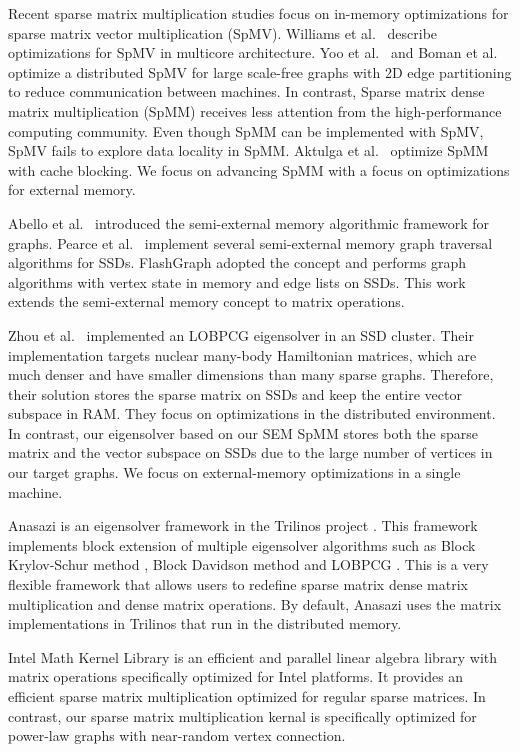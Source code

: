 Recent sparse matrix multiplication studies focus on in-memory optimizations
for sparse matrix vector multiplication (SpMV). Williams et al.~\cite{Williams07}
describe optimizations for SpMV in multicore architecture. Yoo et al.~\cite{Yoo11}
and Boman et al.~\cite{Boman2013} optimize a distributed SpMV for large
scale-free graphs with 2D edge partitioning to reduce communication between
machines. In contrast, Sparse matrix dense matrix multiplication (SpMM) receives
less attention from the high-performance computing community. Even though
SpMM can be implemented with SpMV, SpMV fails to explore data locality in SpMM.
Aktulga et al.~\cite{Aktulga14} optimize SpMM with cache blocking. We focus on
advancing SpMM with a focus on optimizations for external memory.

Abello et al.~\cite{Abello98} introduced the semi-external memory algorithmic
framework for graphs. Pearce et al.~\cite{Pearce10} implement several 
semi-external memory graph traversal algorithms for SSDs. FlashGraph
\cite{flashgraph} adopted the concept and performs graph algorithms with
vertex state in memory and edge lists on SSDs. This work extends the semi-external
memory concept to matrix operations.

Zhou et al.~\cite{Zhou12} implemented an LOBPCG \cite{Arbenz05} eigensolver in
an SSD cluster. Their implementation targets nuclear many-body Hamiltonian
matrices, which are much denser and have smaller dimensions than many sparse
graphs. Therefore, their solution stores the sparse matrix on SSDs and keep
the entire vector subspace in RAM. They focus on optimizations
in the distributed environment. In contrast, our eigensolver based on our
SEM SpMM stores both
the sparse matrix and the vector subspace on SSDs due to the large number
of vertices in our target graphs. We focus on external-memory optimizations
in a single machine.

Anasazi \cite{anasazi} is an eigensolver framework in the Trilinos project
\cite{trilinos}. This framework implements block extension of multiple
eigensolver algorithms
such as Block Krylov-Schur method \cite{krylovschur}, Block Davidson method
\cite{Arbenz05} and LOBPCG \cite{Arbenz05}. This is a very flexible framework
that allows users to redefine sparse matrix dense matrix multiplication and
dense matrix operations. By default, Anasazi uses the matrix implementations
in Trilinos that run in the distributed memory.

Intel Math Kernel Library \cite{mkl} is an efficient and parallel linear
algebra library with matrix operations specifically optimized for Intel
platforms. It provides an efficient sparse matrix multiplication optimized
for regular sparse matrices. In contrast, our sparse matrix multiplication
kernal is specifically optimized for power-law graphs with near-random vertex
connection.
